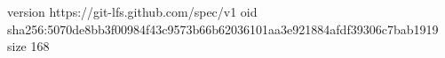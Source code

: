 version https://git-lfs.github.com/spec/v1
oid sha256:5070de8bb3f00984f43c9573b66b62036101aa3e921884afdf39306c7bab1919
size 168
